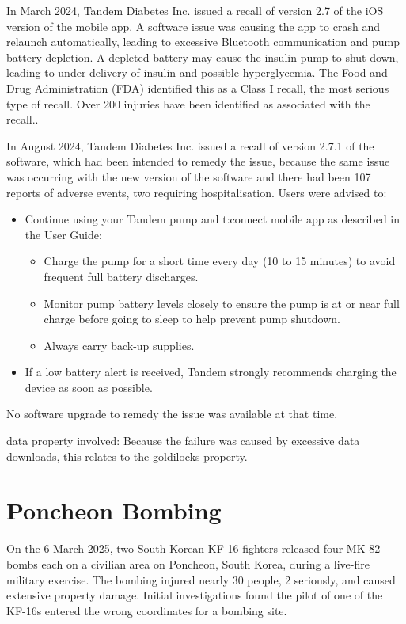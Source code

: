 In March 2024, Tandem Diabetes Inc. issued a recall of version 2.7 of the iOS version of the mobile app. A software issue was causing the app to crash and relaunch automatically, leading to excessive Bluetooth communication and pump battery depletion. A depleted battery may cause the insulin pump to shut down, leading to under delivery of insulin and possible hyperglycemia. The Food and Drug Administration (FDA) identified this as a Class I recall, the most serious type of recall. Over 200 injuries have been identified as associated with the recall.\cite{citation:tandem_initial}.

In August 2024, Tandem Diabetes Inc. issued a recall of version 2.7.1 of the software, which had been intended to remedy the issue, because the same issue was occurring with the new version of the software and there had been 107 reports of adverse events, two requiring hospitalisation\cite{citation:tandem_subsequent}. Users were advised\cite{citation:tandem_recall} to:
\begin{itemize}
	\item Continue using your Tandem pump and t:connect mobile app as described in the User Guide:
	\begin{itemize}
		\item Charge the pump for a short time every day (10 to 15 minutes) to avoid frequent full battery discharges.
		\item Monitor pump battery levels closely to ensure the pump is at or near full charge before going to sleep to help prevent pump shutdown.
		\item Always carry back-up supplies.
	\end{itemize}
	\item If a low battery alert is received, Tandem strongly recommends charging the device as soon as possible.
\end{itemize}

No software upgrade to remedy the issue was available at that time. 

\Gls{data property} involved: Because the failure was caused by excessive data downloads, this relates to the \gls{goldilocks} property.
\section{Poncheon Bombing}\label{bkm:inacc:poncheon}
On the 6 March 2025, two South Korean KF-16 fighters released four MK-82 bombs each on a civilian area on Poncheon, South Korea, during a live-fire military exercise. The bombing injured nearly 30 people, 2 seriously, and caused extensive property damage. Initial investigations found the pilot of one of the KF-16s entered the wrong coordinates for a bombing site.\cite{citation:korea_bombing}

